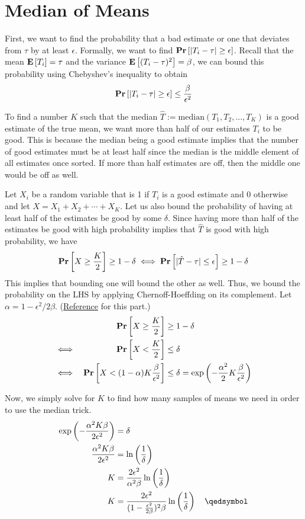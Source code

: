 \chapter{Median of Means}

First, we want to find the probability that a bad estimate or one that deviates from $\tau$ by at least $\epsilon$. Formally, we want to find $\mathbf{Pr}\left[|T_i - \tau| \geq \epsilon\right]$. Recall that the mean $\mathbf{E}\left[T_i\right] = \tau$ and the variance $\mathbf{E}\left[(T_i - \tau)^2\right] = \beta$, we can bound this probability using Chebyshev's inequality to obtain
\[ \mathbf{Pr}\left[|T_i - \tau| \geq \epsilon\right] \leq \frac{\beta}{\epsilon^2} \]

To find a number $K$ such that the median $\hat{T} := \text{median}(T_1, T_2, ..., T_K)$ is a good estimate of the true mean, we want more than half of our estimates $T_i$ to be good. This is because the median being a good estimate implies that the number of good estimates must be at least half since the median is the middle element of all estimates once sorted. If more than half estimates are off, then the middle one would be off as well.

Let $X_i$ be a random variable that is 1 if $T_i$ is a good estimate and 0 otherwise and let $X = X_1 + X_2 + \cdots + X_K$. Let us also bound the probability of having at least half of the estimates be good by some $\delta$. Since having more than half of the estimates be good with high probability implies that $\hat{T}$ is good with high probability, we have
\[ \mathbf{Pr}\left[X \geq \frac{K}{2}\right] \geq 1 - \delta \iff \mathbf{Pr}\left[|\hat{T} - \tau| \leq \epsilon\right] \geq 1 - \delta \]
This implies that bounding one will bound the other as well. Thus, we bound the probability on the LHS by applying Chernoff-Hoeffding on its complement. Let $\alpha = 1 - \epsilon^2/2\beta$. (\href{https://perso.eleves.ens-rennes.fr/people/igor.martayan/blog/median-trick/}{Reference} for this part.)
\begin{equation*}
\begin{aligned}
	&& \mathbf{Pr}\left[X \geq \frac{K}{2}\right] &\geq 1 - \delta \\
	\iff && \mathbf{Pr}\left[X < \frac{K}{2}\right] &\leq \delta \\
	\iff && \mathbf{Pr}\left[X < (1 - \alpha)K\frac{\beta}{\epsilon^2}\right] &\leq \delta = \exp\left(-\frac{\alpha^2}{2}K\frac{\beta}{\epsilon^2}\right)
\end{aligned}
\end{equation*}

Now, we simply solve for $K$ to find how many samples of means we need in order to use the median trick.
\[
\begin{aligned}
	\exp\left(-\frac{\alpha^2K\beta}{2\epsilon^2}\right) &= \delta \\
	\frac{\alpha^2K\beta}{2\epsilon^2} &= \ln\left(\frac{1}{\delta}\right) \\
	K &= \frac{2\epsilon^2}{\alpha^2\beta}\ln\left(\frac{1}{\delta}\right) \\
	K &= \frac{2\epsilon^2}{(1 - \frac{\epsilon^2}{2\beta})^2\beta}\ln\left(\frac{1}{\delta}\right) \quad \qedsymbol
\end{aligned}
\]

